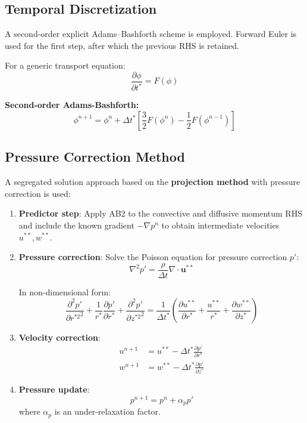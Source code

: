 \documentclass[12pt,a4paper]{article}
\newcommand{\parder}[2]{\frac{\partial #1}{\partial #2}}
\newcommand{\pparder}[2]{\frac{\partial^2 #1}{\partial {#2}^2}}
\begin{document}
\subsection{Temporal Discretization}

A second-order explicit Adams--Bashforth scheme is employed. Forward Euler is
used for the first step, after which the previous RHS is retained.

For a generic transport equation:
\begin{equation}
    \parder{\phi}{t^*} = F(\phi)
\end{equation}

\textbf{Second-order Adams-Bashforth:}
\begin{equation}
    \phi^{n+1} = \phi^n + \Delta t^*\left[\frac{3}{2}F(\phi^n) - \frac{1}{2}F(\phi^{n-1})\right]
\end{equation}

\subsection{Pressure Correction Method}

A segregated solution approach based on the \textbf{projection method} with pressure correction is used:

\begin{enumerate}
    \item \textbf{Predictor step}: Apply AB2 to the convective and diffusive
    momentum RHS and include the known gradient $-\nabla p^n$ to obtain
    intermediate velocities $u^{**}, w^{**}$.

    \item \textbf{Pressure correction}: Solve the Poisson equation for pressure correction $p'$:
    \begin{equation}
        \nabla^2 p' = \frac{\rho}{\Delta t}\nabla \cdot \bm{u}^{**}
        \label{eq:poisson}
    \end{equation}

    In non-dimensional form:
    \begin{equation}
        \pparder{p'}{r^{*2}} + \frac{1}{r^*}\parder{p'}{r^*} + \pparder{p'}{z^{*2}} = \frac{1}{\Delta t^*}\left(\parder{u^{**}}{r^*} + \frac{u^{**}}{r^*} + \parder{w^{**}}{z^*}\right)
    \end{equation}

    \item \textbf{Velocity correction}:
    \begin{align}
        u^{n+1} &= u^{**} - \Delta t^*\parder{p'}{r^*} \\
        w^{n+1} &= w^{**} - \Delta t^*\parder{p'}{z^*}
    \end{align}

    \item \textbf{Pressure update}:
    \begin{equation}
        p^{n+1} = p^n + \alpha_p p'
    \end{equation}
    where $\alpha_p$ is an under-relaxation factor.
\end{enumerate}
\end{document}
